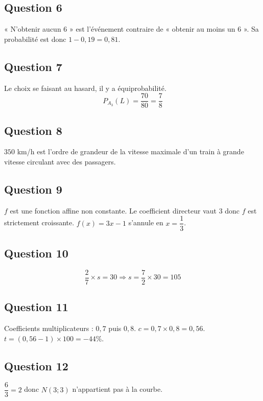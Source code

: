 \documentclass[a4paper,12pt]{article}
\begin{document}
\subsection*{Question 6}
« N'obtenir aucun 6 » est l'événement contraire de « obtenir au moins un 6 ». Sa probabilité est donc $1 - 0,19 = 0,81$.


\subsection*{Question 7}
Le choix se faisant au hasard, il y a équiprobabilité.
\[
P_{A_3}(L) = \frac{70}{80} = \frac{7}{8}
\]


\subsection*{Question 8}
$350$ km/h est l'ordre de grandeur de la vitesse maximale d'un train à grande vitesse circulant avec des passagers.


\subsection*{Question 9}
$f$ est une fonction affine non constante. Le coefficient directeur vaut 3 donc $f$ est strictement croissante. $f(x) = 3x - 1$ s'annule en $x = \dfrac{1}{3}$.


\subsection*{Question 10}
\[
\frac{2}{7} \times s = 30 \Rightarrow s = \frac{7}{2} \times 30 = 105
\]


\subsection*{Question 11}
Coefficients multiplicateurs : $0,7$ puis $0,8$. $c = 0,7 \times 0,8 = 0,56$. $t = (0,56 - 1) \times 100 = -44\%$.


\subsection*{Question 12}
$\dfrac{6}{3} = 2$ donc $N(3;3)$ n'appartient pas à la courbe.
\end{document}
